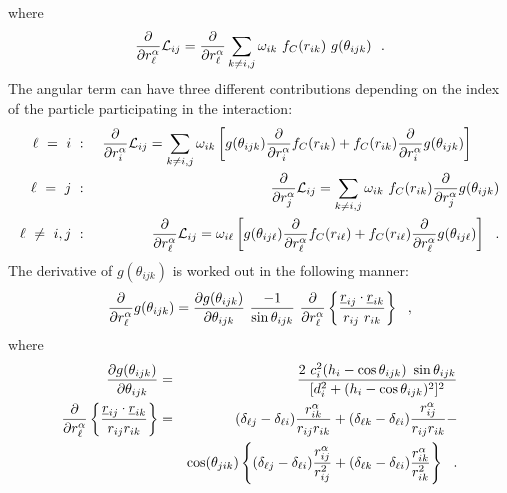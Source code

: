 where
\begin{equation}
\frac{\partial}{\partial r_{\ell}^{\alpha}} {\cal{L}}_{ij} =
\frac{\partial}{\partial r_{\ell}^{\alpha}} \sum_{k \neq i,j}
\omega_{ik}~f_{C}(r_{ik})~g(\theta_{ijk})~~.  \nonumber
\end{equation}
The angular term can have three different contributions depending
on the index of the particle participating in the interaction:
\begin{eqnarray}
\ell~=~i~&:&~\frac{\partial}{\partial r_{i}^{\alpha}} {\cal{L}}_{ij} = \sum_{k \neq i,j} \omega_{ik}
\left[ g(\theta_{ijk}) \frac{\partial}{\partial r_{i}^{\alpha}} f_{C}(r_{ik}) +
f_{C}(r_{ik}) \frac{\partial}{\partial r_{i}^{\alpha}} g(\theta_{ijk}) \right]~~~~~~\\
\ell~=~j~&:&~\frac{\partial}{\partial r_{j}^{\alpha}} {\cal{L}}_{ij} = \sum_{k \neq i,j} \omega_{ik}
~f_{C}(r_{ik}) \frac{\partial}{\partial r_{j}^{\alpha}} g(\theta_{ijk}) \\
\ell~\neq~i,j~&:&~\frac{\partial}{\partial r_{\ell}^{\alpha}} {\cal{L}}_{ij} = \omega_{i \ell}
\left[ g(\theta_{ij \ell}) \frac{\partial}{\partial r_{\ell}^{\alpha}} f_{C}(r_{i \ell}) +
f_{C}(r_{i \ell}) \frac{\partial}{\partial r_{\ell}^{\alpha}} g(\theta_{ij \ell}) \right]~~.
\end{eqnarray}
The derivative of $g(\theta_{ijk})$ is worked out in the following
manner:
\begin{equation}
\frac{\partial}{\partial r_{\ell}^{\alpha}} g(\theta_{ijk}) =
\frac{\partial g(\theta_{ijk})}{\partial \theta_{ijk}}~
\frac{-1}{\sin \theta_{ijk}}~\frac{\partial}{\partial r_{\ell}^{\alpha}}
\left\{ \frac{\mbox{$\underline{r}$}_{ij} \cdot \mbox{$\underline{r}$}_{ik}} {r_{ij}~r_{ik}} \right\}~~,
\end{equation}
where
\begin{eqnarray}
\frac{\partial g(\theta_{ijk})}{\partial \theta_{ijk}}&=&
\frac{2~c_{i}^2(h_{i} - \cos \theta_{ijk})~\sin \theta_{ijk}}
{[d_{i}^2 + (h_{i} - \cos \theta_{ijk})^2]^2} \\
\frac{\partial}{\partial r_{\ell}^{\alpha}}
\left\{\frac{\mbox{$\underline{r}$}_{ij}\cdot\mbox{$\underline{r}$}_{ik}}{r_{ij}r_{ik}}\right\}&=&
(\delta_{\ell j}-\delta_{\ell i})\frac{r_{ik}^{\alpha}}{r_{ij}r_{ik}} +
(\delta_{\ell k}-\delta_{\ell i})\frac{r_{ij}^{\alpha}}{r_{ij}r_{ik}} - \nonumber \\
& & \cos(\theta_{jik}) \left\{(\delta_{\ell j}-\delta_{\ell i})\frac{r_{ij}^{\alpha}}{r_{ij}^{2}}+
(\delta_{\ell k}-\delta_{\ell i})\frac{r_{ik}^{\alpha}}{r_{ik}^{2}}\right\}~~.
\end{eqnarray}

